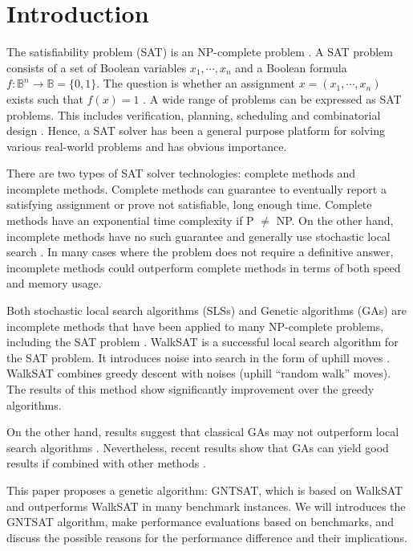 \section{Introduction}
The satisfiability problem (SAT) is an NP-complete problem
\parencite{cook_1971}. A SAT problem consists of a set of Boolean variables
$x_1, \cdots, x_n$ and a Boolean formula $f: \mathbb{B}^n \rightarrow \mathbb{B}=\{0, 1\}$. The
question is whether an assignment $x=(x_1, \cdots, x_n)$ exists such that
$f(x)=1$ \parencite{gottlieb_marchiori_rossi_2002}. A wide range of problems can be
expressed as SAT problems. This includes verification, planning, scheduling
and combinatorial design \parencite{biere2009handbook}. Hence, a SAT solver has been a
general purpose platform for solving various real-world problems and has
obvious importance.

There are two types of SAT solver technologies: complete methods and
incomplete methods. Complete methods can guarantee to eventually report a
satisfying assignment or prove not satisfiable, long enough time. Complete
methods have an exponential time complexity if P $\neq$ NP. On
the other hand, incomplete methods have no such guarantee and generally use
stochastic local search \parencite{gomes_kautz_sabharwal_selman_2008}. In many cases where the problem
does not require a definitive answer, incomplete methods could outperform
complete methods in terms of both speed and memory usage.

Both stochastic local search algorithms (SLSs) and Genetic algorithms (GAs)
are incomplete methods that have been applied to many NP-complete problems,
including the SAT problem \parencite{gottlieb_marchiori_rossi_2002}.  WalkSAT
\parencite{selman1994noise} is a successful local search algorithm for the SAT
problem. It introduces noise into search in the form of uphill moves
\parencite{biere2009handbook}. WalkSAT combines greedy descent with noises (uphill
``random walk'' moves). The results of this method show significantly
improvement over the greedy algorithms.

On the other hand, results suggest that classical GAs may not outperform local
search algorithms \parencite{de1989using}. Nevertheless, recent results show
that GAs can yield good results if combined with other methods
\parencite{gottlieb_marchiori_rossi_2002}.

This paper proposes a genetic algorithm: GNTSAT, which is based on WalkSAT
\parencite{selman1994noise} and outperforms WalkSAT in many benchmark instances. We
will introduces the GNTSAT algorithm, make performance evaluations based on
benchmarks, and discuss the possible reasons for the performance difference
and their implications.
